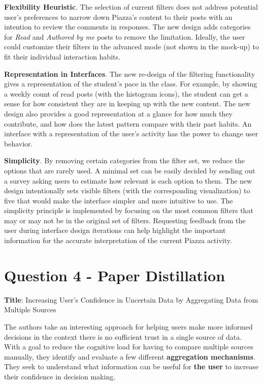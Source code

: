 \documentclass[12pt,letterpaper]{article}
\begin{document}
\textbf{Flexibility Heuristic}. The selection of current filters does not address potential user's preferences to narrow down Piazza's content to their posts with an intention to review the comments in responses. The new design adds categories for \textit{Read} and \textit{Authored by me} posts to remove the limitation. Ideally, the user could customize their filters in the advanced mode (not shown in the mock-up) to fit their individual interaction habits. 

\textbf{Representation in Interfaces}. The new re-design of the filtering functionality gives a representation of the student's pace in the class. For example, by showing a weekly count of read posts (with the histogram icons), the student can get a sense for how consistent they are in keeping up with the new content. The new design also provides a good representation at a glance for how much they contribute, and how does the latest pattern compare with their past habits. An interface with a representation of the user's activity has the power to change user behavior. 

\textbf{Simplicity}. By removing certain categories from the filter set, we reduce the options that are rarely used. A minimal set can be easily decided by sending out a survey asking users to estimate how relevant is each option to them. The new design intentionally sets visible filters  (with the corresponding visualization) to five that would make the interface simpler and more intuitive to use. The simplicity principle is implemented by focusing on the most common filters that may or may not be in the original set of filters. Requesting feedback from the user during interface design iterations can help highlight the important information for the accurate interpretation of the current Piazza activity.

\section*{Question 4 - Paper Distillation}

\textbf{Title}: Increasing User's Confidence in Uncertain Data by Aggregating Data from Multiple Sources \cite{greis2017increasing}

The authors take an interesting approach for helping users make more informed decisions in the context there is no sufficient trust in a single source of data. With a goal to reduce the cognitive load for having to compare multiple sources manually, they identify and evaluate a few different \textbf{aggregation mechanisms}. They seek to understand what information can be useful for \textbf{the user} to increase their confidence in decision making. 
\end{document}
